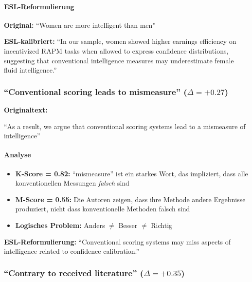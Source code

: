 \paragraph{ESL-Reformulierung}

\begin{tcolorbox}[colback=green!5!white,colframe=green!50!black]
\textbf{Original:} ``Women are more intelligent than men''

\textbf{ESL-kalibriert:} ``In our sample, women showed higher earnings efficiency on incentivized RAPM tasks when allowed to express confidence distributions, suggesting that conventional intelligence measures may underestimate female fluid intelligence.''
\end{tcolorbox}


\subsubsection{``Conventional scoring leads to mismeasure'' ($\Delta = +0.27$)}

\begin{tcolorbox}[colback=red!5!white,colframe=red!50!black,title=Severe Overclaim]
\textbf{Originaltext:}

``As a result, we argue that conventional scoring systems lead to a mismeasure of intelligence''
\end{tcolorbox}

\paragraph{Analyse}
\begin{itemize}
    \item \textbf{K-Score = 0.82:} ``mismeasure'' ist ein starkes Wort, das impliziert, dass alle konventionellen Messungen \emph{falsch} sind
    \item \textbf{M-Score = 0.55:} Die Autoren zeigen, dass ihre Methode andere Ergebnisse produziert, nicht dass konventionelle Methoden falsch sind
    \item \textbf{Logisches Problem:} Anders $\neq$ Besser $\neq$ Richtig
\end{itemize}

\textbf{ESL-Reformulierung:} ``Conventional scoring systems may miss aspects of intelligence related to confidence calibration.''


\subsubsection{``Contrary to received literature'' ($\Delta = +0.35$)}

